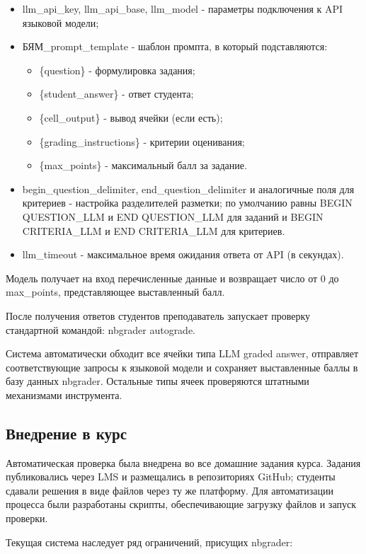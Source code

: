 \begin{itemize}
    \item llm\_api\_key, llm\_api\_base, llm\_model - параметры подключения к API языковой модели;
    \item БЯМ\_prompt\_template - шаблон промпта, в который подставляются:
        \begin{itemize}
            \item \{question\} - формулировка задания;
            \item \{student\_answer\} - ответ студента;
            \item \{cell\_output\} - вывод ячейки (если есть);
            \item \{grading\_instructions\} - критерии оценивания;
            \item \{max\_points\} - максимальный балл за задание.
        \end{itemize}
    \item begin\_question\_delimiter, end\_question\_delimiter и аналогичные поля для критериев - настройка разделителей разметки; по умолчанию равны BEGIN QUESTION\_LLM и END QUESTION\_LLM для заданий и BEGIN CRITERIA\_LLM и END CRITERIA\_LLM для критериев.
    \item llm\_timeout - максимальное время ожидания ответа от API (в секундах).
\end{itemize}
Модель получает на вход перечисленные данные и возвращает число от 0 до max\_points, представляющее выставленный балл.

После получения ответов студентов преподаватель запускает проверку стандартной командой: nbgrader autograde.

Система автоматически обходит все ячейки типа LLM graded answer, отправляет соответствующие запросы к языковой модели и сохраняет выставленные баллы в базу данных nbgrader. Остальные типы ячеек проверяются штатными механизмами инструмента.

\subsection{Внедрение в курс}

Автоматическая проверка была внедрена во все домашние задания курса. Задания публиковались через LMS и размещались в репозиториях GitHub; студенты сдавали решения в виде файлов через ту же платформу. Для автоматизации процесса были разработаны скрипты, обеспечивающие загрузку файлов и запуск проверки.

Текущая система наследует ряд ограничений, присущих nbgrader:

